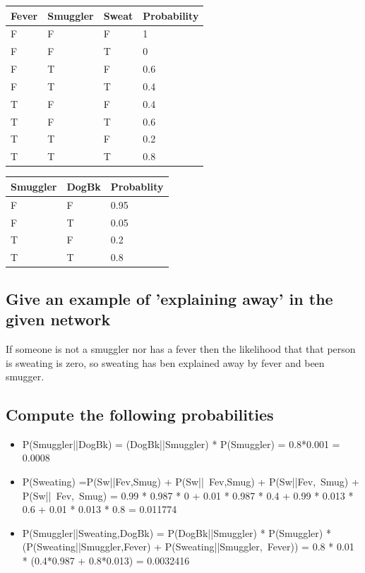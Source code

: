 \documentclass[paper=a4, fontsize=11pt]{scrartcl} %
\numberwithin{equation}{section} %
\numberwithin{figure}{section} %
\numberwithin{table}{section} %
\begin{document}
\begin{tabular}{|l|||l||| l ||l|}
\hline
Fever & Smuggler & Sweat & Probability\\
\hline
F & F & F & 1\\
\hline
F & F & T & 0 \\
\hline
F & T & F & 0.6\\
\hline

F & T & T & 0.4\\
\hline
T & F & F & 0.4\\
\hline
T & F & T & 0.6\\
\hline
T & T & F & 0.2\\
\hline
T & T & T & 0.8\\
\hline

\end{tabular}
\newline

\begin{tabular}{|l|||l||l|}
\hline
Smuggler & DogBk & Probablity\\
\hline
F & F & 0.95\\
\hline
F & T & 0.05\\
\hline
T & F & 0.2\\
\hline
T & T & 0.8\\
\hline
\end{tabular}





\subsection*{Give an example of 'explaining away' in the given network}

If someone is not a smuggler nor has a fever then the likelihood that that person is sweating is zero, so sweating has ben explained away by fever and been smugger.

\subsection*{Compute the following probabilities}
\begin{itemize}

\item P(Smuggler||DogBk) = (DogBk||Smuggler) * P(Smuggler) = 0.8*0.001 = 0.0008

\item P(Sweating) =P(Sw||Fev,Smug) + P(Sw||~Fev,Smug) + P(Sw||Fev,~Smug) + P(Sw||~Fev,~Smug) = 0.99 * 0.987 * 0 + 0.01 * 0.987 * 0.4 + 0.99 * 0.013 * 0.6 + 0.01 * 0.013 * 0.8 = 0.011774

\item P(Smuggler||Sweating,DogBk) = P(DogBk||Smuggler) * P(Smuggler) * (P(Sweating||Smuggler,Fever) + P(Sweating||Smuggler,~Fever)) =
0.8 * 0.01 * (0.4*0.987 + 0.8*0.013) = 0.0032416


\end{itemize}

\end{document}
